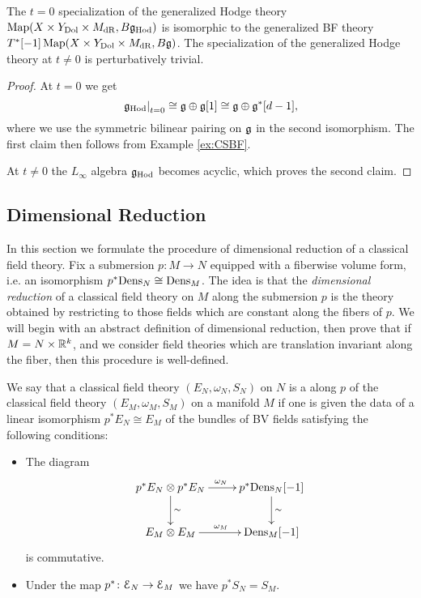 \documentclass[10pt, oneside]{article}
\begin{document}
\begin{prop}
The $t=0$ specialization of the generalized Hodge theory $\operatorname{Map}(X\times Y_{\mathrm{Dol}}\times M_{\mathrm{dR}}, B \mathfrak g_{\mathrm{Hod}})$ is isomorphic to the generalized BF theory $T^*[-1]\operatorname{Map}(X\times Y_{\mathrm{Dol}}\times M_{\mathrm{dR}}, B \mathfrak g)$. The specialization of the generalized Hodge theory at $t\neq 0$ is perturbatively trivial.
\label{prop:Hodgetheoryspecialization}
\end{prop}

\begin{proof}
At $t=0$ we get
\[\left.\mathfrak g_{\mathrm{Hod}}\right|_{t=0}\cong \mathfrak g\oplus \mathfrak g[1]\cong \mathfrak g\oplus \mathfrak g^*[d-1],\]
where we use the symmetric bilinear pairing on $\mathfrak g$ in the second isomorphism. The first claim then follows from Example \ref{ex:CSBF}.

At $t\neq 0$ the $L_\infty$ algebra $\mathfrak g_{\mathrm{Hod}}$ becomes acyclic, which proves the second claim.
\end{proof}

\subsection{Dimensional Reduction} \label{dim_red_section}

In this section we formulate the procedure of dimensional reduction of a classical field theory. Fix a submersion $p\colon M\rightarrow N$ equipped with a fiberwise volume form, i.e. an isomorphism $p^*\mathrm{Dens}_N\cong \mathrm{Dens}_M$.  The idea is that the \emph{dimensional reduction} of a classical field theory on $M$ along the submersion $p$ is the theory obtained by restricting to those fields which are constant along the fibers of $p$.  We will begin with an abstract definition of dimensional reduction, then prove that if $M = N \times \mathbb R^k$, and we consider field theories which are translation invariant along the fiber, then this procedure is well-defined.

\begin{definition}
We say that a classical field theory $(E_N, \omega_N, S_N)$ on $N$ is a  along $p$ of the classical field theory $(E_M, \omega_M, S_M)$ on a manifold $M$ if one is given the data of a linear isomorphism $p^* E_N\cong E_M$ of the bundles of BV fields satisfying the following conditions:
\begin{itemize}
\item The diagram
\[
\xymatrix{
p^* E_N\otimes p^* E_N \ar^{\omega_N}[r] \ar^{\sim}[d] & p^*\Dens_N[-1] \ar^{\sim}[d] \\
E_M\otimes E_M \ar^{\omega_M}[r] & \Dens_M[-1]
}
\]
is commutative.

\item Under the map $p^*\colon \mathcal E_N\rightarrow \mathcal E_M$ we have $p^* S_N = S_M$.
\end{itemize}
\end{definition}
\end{document}
